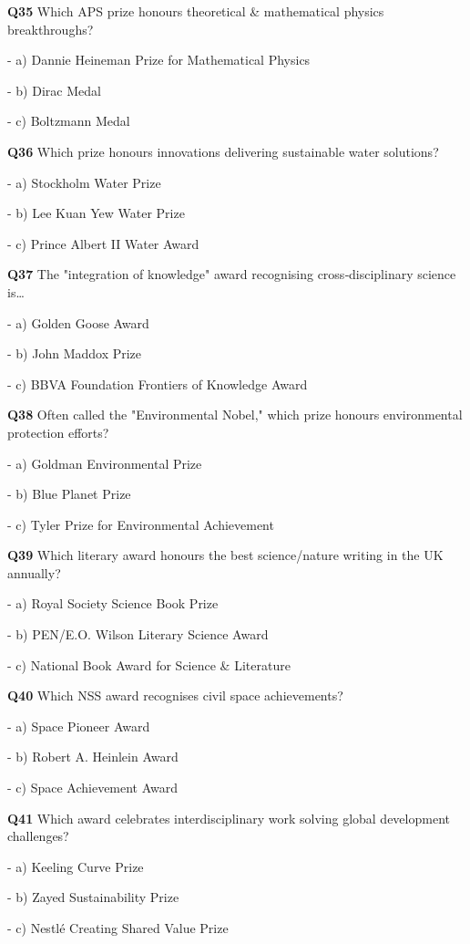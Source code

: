 \textbf{Q35} Which APS prize honours theoretical & mathematical physics breakthroughs?\par
\quad - a) Dannie Heineman Prize for Mathematical Physics\par
\quad - b) Dirac Medal\par
\quad - c) Boltzmann Medal\par

\textbf{Q36} Which prize honours innovations delivering sustainable water solutions?\par
\quad - a) Stockholm Water Prize\par
\quad - b) Lee Kuan Yew Water Prize\par
\quad - c) Prince Albert II Water Award\par

\textbf{Q37} The "integration of knowledge" award recognising cross‑disciplinary science is…\par
\quad - a) Golden Goose Award\par
\quad - b) John Maddox Prize\par
\quad - c) BBVA Foundation Frontiers of Knowledge Award\par

\textbf{Q38} Often called the "Environmental Nobel," which prize honours environmental protection efforts?\par
\quad - a) Goldman Environmental Prize\par
\quad - b) Blue Planet Prize\par
\quad - c) Tyler Prize for Environmental Achievement\par

\textbf{Q39} Which literary award honours the best science/nature writing in the UK annually?\par
\quad - a) Royal Society Science Book Prize\par
\quad - b) PEN/E.O. Wilson Literary Science Award\par
\quad - c) National Book Award for Science & Literature\par

\textbf{Q40} Which NSS award recognises civil space achievements?\par
\quad - a) Space Pioneer Award\par
\quad - b) Robert A. Heinlein Award\par
\quad - c) Space Achievement Award\par

\textbf{Q41} Which award celebrates interdisciplinary work solving global development challenges?\par
\quad - a) Keeling Curve Prize\par
\quad - b) Zayed Sustainability Prize\par
\quad - c) Nestlé Creating Shared Value Prize\par

